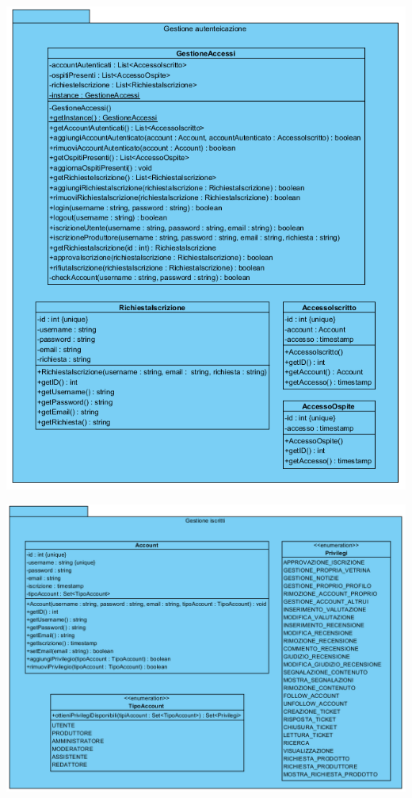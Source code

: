 \begin{center}
			\includegraphics[width=\textwidth]{assets/visualParadigm/classi/GestioneAutenticazione}
\end{center}

\begin{center}
			\includegraphics[width=\textwidth]{assets/visualParadigm/classi/GestioneIscritti}
\end{center}

